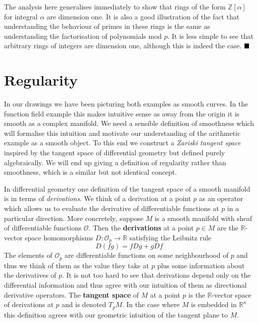 \documentclass{article}
\newcommand{\Z}{\ensuremath{\mathbb{Z}}}
\newcommand{\R}{\ensuremath{\mathbb{R}}}
\newcommand{\Ox}{\mathscr{O}}
\theoremstyle{definition}
\begin{document}
The analysis here generalises immediately to show that rings of the form $\Z[\alpha]$ for integral $\alpha$ are dimension one.
It is also a good illustration of the fact that understanding the behaviour of primes in these rings is the same as understanding the factorisation of polynomials mod $p$. 
It is less simple to see that arbitrary rings of integers are dimension one, although this is indeed the case.
$\hfill\blacksquare$

\section{Regularity}
\label{smoothSec}
In our drawings we have been picturing both examples as smooth curves. In the function field example this makes intuitive sense as away from the origin it is smooth as a complex manifold.
We need a sensible definition of smoothness which will formalise this intuition and motivate our understanding of the arithmetic example as a smooth object.
To this end we construct a \textit{Zariski tangent space} inspired by the tangent space of differential geometry but defined purely algebraically.
We will end up giving a definition of regularity rather than smoothness, which is a similar but not identical concept.

In differential geometry one definition of the tangent space of a smooth manifold is in terms of \textit{derivations}.
We think of a derivation at a point $p$ as an operator which allows us to evaluate the derivative of differentiable functions at $p$ in a particular direction.
More concretely, suppose $M$ is a smooth manifold with sheaf of differentiable functions $\Ox$. 
Then the \textbf{derivations} at a point $p \in M$ are the $\R$-vector space homomorphisms $D:\Ox_p \to \R$ satisfying the Leibnitz rule
$$D(fg) = fDg + gDf$$
The elements of $\Ox_p$ are differentiable functions on some neighbourhood of $p$ and thus we think of them as the value they take at $p$ plus some information about the derivatives of $p$.
It is not too hard to see that derivations depend only on the differential information and thus agree with our intuition of them as directional derivative operators.
The \textbf{tangent space} of $M$ at a point $p$ is the $\R$-vector space of derivations at $p$ and is denoted $T_pM$.
In the case where $M$ is embedded in $\R^n$ this definition agrees with our geometric intuition of the tangent plane to $M$.
\end{document}
